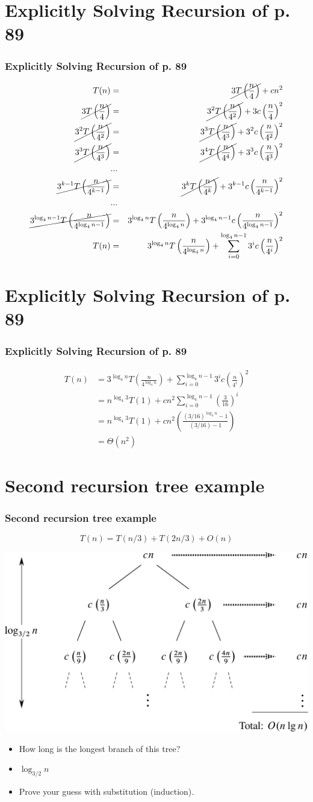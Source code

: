 \documentclass{beamer}
\newcommand{\sect}[1]{
\section{#1}
\begin{frame}[fragile]\frametitle{#1}
}
\newcommand{\bi}{\begin{itemize}}
\newcommand{\ii}{\item}
\newcommand{\ei}{\end{itemize}}
\begin{document}
\sect{Explicitly Solving Recursion of p. 89}
\begin{eqnarray*}
T(n) &=& \cancel{3T\left(\frac{n}{4}\right)}+ cn^2\\
\cancel{3T\left(\frac{n}{4}\right)} &=& \cancel{3^2T\left(\frac{n}{4^2}\right) } + 3c\left(\frac{n}{4}\right)^2\\
\cancel{3^2T\left(\frac{n}{4^2}\right)} &=& \cancel{3^3T\left(\frac{n}{4^3}\right)}  + 3^2c\left(\frac{n}{4^2}\right)^2\\
\cancel{3^3T\left(\frac{n}{4^3}\right)} &=& \cancel{3^4T\left(\frac{n}{4^4}\right)}  + 3^3c\left(\frac{n}{4^3}\right)^2\\
&...&\\
\cancel{3^{k-1}T\left(\frac{n}{4^{k-1}}\right)} &=& \cancel{3^{k}T\left(\frac{n}{4^{k}}\right)}  + 3^{k-1}c\left(\frac{n}{4^{k-1}}\right)^2\\
&...&\\
\cancel{3^{\log_4 n-1}T\left(\frac{n}{4^{\log_4 n-1}}\right)} &=& 3^{\log_4 n}T\left(\frac{n}{4^{\log_4 n}}\right)  + 3^{\log_4 n-1}c\left(\frac{n}{4^{\log_4 n-1}}\right)^2\\
T(n) &=&3^{\log_4 n}T\left(\frac{n}{4^{\log_4 n}}\right)  + \sum_{i=0}^{\log_4 n-1}3^{i}c\left(\frac{n}{4^{i}}\right)^2\\
\end{eqnarray*}
\end{frame}

\sect{Explicitly Solving Recursion of p. 89}
\begin{align*}
  T(n) &=
  3^{\log_4 n}T\left(\frac{n}{4^{\log_4 n}}\right)
  + \sum_{i=0}^{\log_4 n-1}3^{i}c\left(\frac{n}{4^{i}}\right)^2\\
  &=   n^{\log_4 3}T(1)
  + cn^2\sum_{i=0}^{\log_4 n-1}\left(\frac{3}{16}\right)^i\\
  &=
     n^{\log_4 3}T(1)
     + cn^2\left(\frac{(3/16)^{\log_4 n} - 1}{(3/16)-1}\right)\\
 &= \Theta(n^2)
     \end{align*}


\end{frame}


\sect{Second recursion tree example}
\[ T(n) = T(n/3) + T(2n/3) + O(n) \]
\vfill

\includegraphics[scale=0.1]{Fig-4-6.pdf}
\bi
\pause
\ii How long is the longest branch of this tree?
\pause
\ii $\log_{3/2} n$
\pause
\ii Prove your guess with substitution (induction).
\ei

\end{frame}
\end{document}
